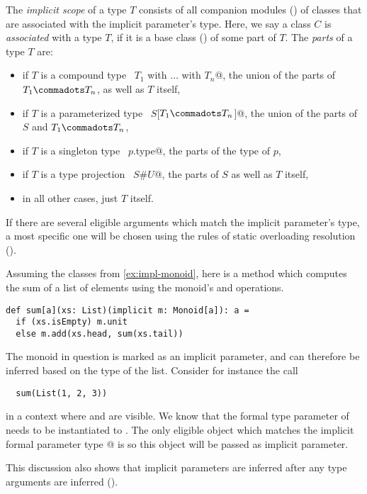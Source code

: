 The {\em implicit scope} of a type $T$ consists of all companion modules
() of classes that are associated with the
implicit parameter's type.  Here, we say a class $C$ is {\em
associated} with a type $T$, if it is a base class
() of some part of $T$.  The {\em parts} of a
type $T$ are:
\begin{itemize}
\item
if $T$ is a compound type ~\lstinline@$T_1$ with $\ldots$ with $T_n$@, the
union of the parts of $T_1 \commadots T_n$, as well as $T$ itself,
\item
if $T$ is a parameterized type ~\lstinline@$S$[$T_1 \commadots T_n$]@, 
the union of the parts of $S$ and $T_1 \commadots T_n$,
\item
if $T$ is a singleton type ~\lstinline@$p$.type@, the parts of the type
of $p$,
\item
if $T$ is a type projection ~\lstinline@$S$#$U$@, the parts of $S$ as
well as $T$ itself,
\item
in all other cases, just $T$ itself.
\end{itemize}

If there are several eligible arguments which match the implicit
parameter's type, a most specific one will be chosen using the rules
of static overloading resolution ().

\example Assuming the classes from \ref{ex:impl-monoid}, here is a 
method which computes the sum of a list of elements using the
monoid's  and  operations.
\begin{lstlisting}
def sum[a](xs: List)(implicit m: Monoid[a]): a = 
  if (xs.isEmpty) m.unit
  else m.add(xs.head, sum(xs.tail))
\end{lstlisting}
The monoid in question is marked as an implicit parameter, and can therefore
be inferred based on the type of the list.
Consider for instance the call 
\begin{lstlisting}
  sum(List(1, 2, 3))
\end{lstlisting}
in a context where \lstinline@stringMonoid@ and \lstinline@intMonoid@
are visible.  We know that the formal type parameter \lstinline@a@ of
\lstinline@sum@ needs to be instantiated to \lstinline@Int@. The only
eligible object which matches the implicit formal parameter type
\lstinline@Monoid[Int]@ is \lstinline@intMonoid@ so this object will
be passed as implicit parameter.\bigskip

This discussion also shows that implicit parameters are inferred after
any type arguments are inferred (). 

